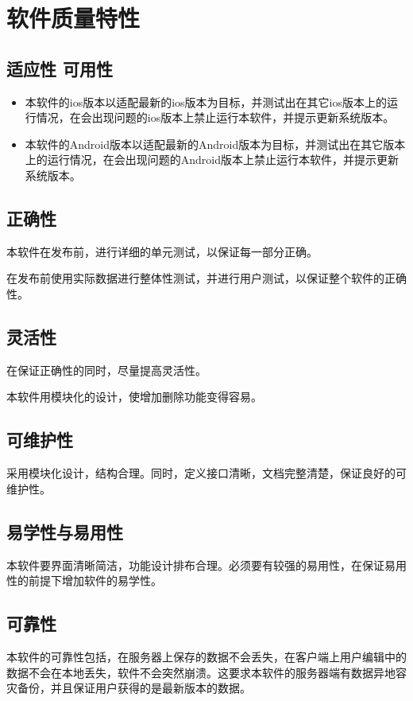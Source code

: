 \chapter{软件质量特性}
	\section{适应性 可用性}
\begin{itemize}
	\item 本软件的ios版本以适配最新的ios版本为目标，并测试出在其它ios版本上的运行情况，在会出现问题的ios版本上禁止运行本软件，并提示更新系统版本。

	\item 本软件的Android版本以适配最新的Android版本为目标，并测试出在其它版本上的运行情况，在会出现问题的Android版本上禁止运行本软件，并提示更新系统版本。
\end{itemize}

	\section{正确性}
	本软件在发布前，进行详细的单元测试，以保证每一部分正确。

	在发布前使用实际数据进行整体性测试，并进行用户测试，以保证整个软件的正确性。

	\section{灵活性}
	在保证正确性的同时，尽量提高灵活性。

	本软件用模块化的设计，使增加删除功能变得容易。

	\section{可维护性}
	采用模块化设计，结构合理。同时，定义接口清晰，文档完整清楚，保证良好的可维护性。

	\section{易学性与易用性}
	本软件要界面清晰简洁，功能设计排布合理。必须要有较强的易用性，在保证易用性的前提下增加软件的易学性。

	\section{可靠性}
	本软件的可靠性包括，在服务器上保存的数据不会丢失，在客户端上用户编辑中的数据不会在本地丢失，软件不会突然崩溃。这要求本软件的服务器端有数据异地容灾备份，并且保证用户获得的是最新版本的数据。
